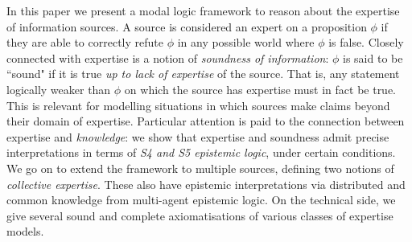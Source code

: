 In this paper we present a modal logic framework to reason about the expertise
of information sources. A source is considered an expert on a proposition
$\phi$
if they are able to correctly refute $\phi$ in any possible world where $\phi$ is
false. Closely connected with expertise is a notion of \emph{soundness of
information}: $\phi$ is said to be ``sound" if it is true \emph{up to lack of
expertise} of the source. That is, any statement logically weaker than $\phi$
on which the source has expertise must in fact be true. This is relevant for
modelling situations in which sources make claims beyond their domain of
expertise.
%
Particular attention is paid to the connection between expertise and
\emph{knowledge}: we show that expertise and soundness admit precise
interpretations in terms of \emph{S4 and S5 epistemic logic}, under certain
conditions.
%
We go on to extend the framework to multiple sources, defining two notions of
\emph{collective expertise}. These also have epistemic interpretations via
distributed and common knowledge from multi-agent epistemic logic.
%
On the technical side, we give several sound and complete axiomatisations of
various classes of expertise models.
